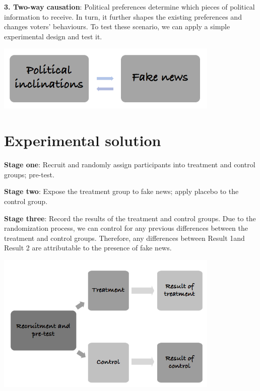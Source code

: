 \documentclass[openany]{book}
\begin{document}
\textbf{3. Two-way causation}: Political preferences determine which pieces of political information to receive. In turn, it further shapes the existing preferences and changes voters' behaviours. To test these scenario, we can apply a simple experimental design and test it.

\includegraphics[width=0.8\textwidth,height=\textheight]{fig/scenario3.png}

\hypertarget{experimental-solution}{%
\section{Experimental solution}\label{experimental-solution}}

\textbf{Stage one}: Recruit and randomly assign participants into treatment and control groups; pre-test.

\textbf{Stage two}: Expose the treatment group to fake news; apply placebo to the control group.

\textbf{Stage three}: Record the results of the treatment and control groups. Due to the randomization process, we can control for any previous differences between the treatment and control groups. Therefore, any differences between Result 1and Result 2 are attributable to the presence of fake news.

\includegraphics[width=0.8\textwidth,height=\textheight]{fig/stage1.png}
\end{document}
